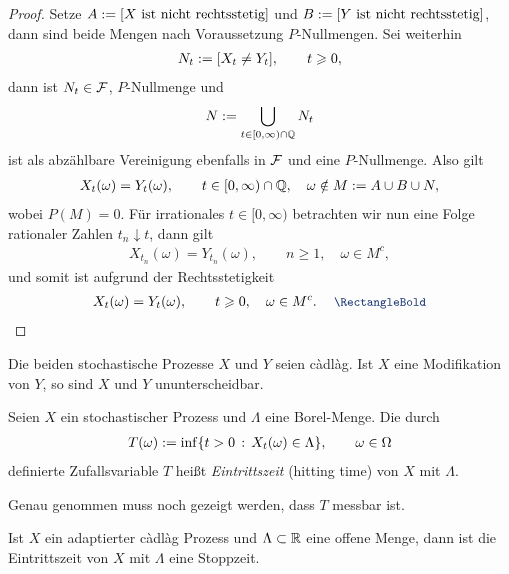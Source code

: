 \begin{proof}
Setze $A:= [X \text{ ist nicht rechtsstetig}]$ und $B:= [Y \text{ ist
nicht rechtsstetig}]$, dann sind beide Mengen nach Voraussetzung $P$-Nullmengen. Sei
weiterhin
\begin{align*}
N_t := [X_t\neq Y_t],\qquad t\geqslant 0,
\end{align*}
dann ist $N_t\in \mathcal{F}$, $P$-Nullmenge und
\begin{align*}
N := \bigcup_{t\in [0,\infty)\cap \mathbb{Q}} N_t
\end{align*} 
ist als abzählbare Vereinigung ebenfalls in $\mathcal{F}$ und eine $P$-Nullmenge. Also
gilt
\begin{align*}
X_t(\omega) = Y_t(\omega),\qquad t\in[0,\infty)\cap\mathbb{Q},\quad \omega\notin M :=
A\cup B\cup N,
\end{align*}
wobei $P(M) = 0$. Für irrationales $t\in [0,\infty)$ betrachten wir nun eine
Folge rationaler Zahlen $t_n\downarrow t$, dann gilt
\begin{align*}
X_{t_n}(\omega) = Y_{t_n}(\omega),\qquad n\ge 1,\quad \omega\in M^c,
\end{align*}
und somit ist aufgrund der Rechtsstetigkeit
\begin{align*}
X_t(\omega) = Y_t(\omega),\qquad t\ge 0,\quad \omega\in M^c.\qed
\end{align*} 
\end{proof}

\begin{cor}
\label{cor:1.1}
Die beiden stochastische Prozesse $X$ und $Y$ seien càdlàg. Ist $X$ eine 
Modifikation von $Y$, so sind $X$ und $Y$ ununterscheidbar.\fish
\end{cor}

\begin{defn}
\label{defn:1.7}
Seien $X$ ein stochastischer Prozess und $\Lambda$ eine Borel-Menge. Die durch
\begin{align*}
T(\omega) \defl \inf\setdef{t > 0}{X_t(\omega)\in \Lambda},\qquad
\omega\in\Omega
\end{align*}
definierte Zufallsvariable $T$ heißt \emph{Eintrittszeit} (hitting
time) von $X$ mit $\Lambda$.\fish
\end{defn}

Genau genommen muss noch gezeigt werden, dass $T$ messbar ist. 

\begin{prop}
\label{prop:1.3}
Ist $X$ ein adaptierter càdlàg Prozess und $\Lambda\subset \mathbb{R}$ eine offene
Menge, dann ist die Eintrittszeit von $X$ mit $\Lambda$ eine Stoppzeit.\fish
\end{prop}

